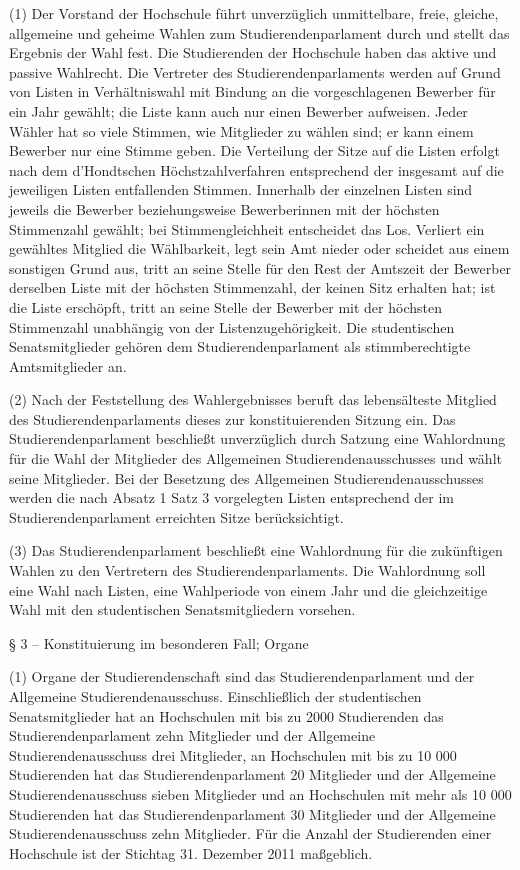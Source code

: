 \documentclass[
10pt,
a4paper,
twoside,								%
titlepage=false,							%
draft=false								%
]{scrartcl}
\begin{document}
(1) Der Vorstand der Hochschule führt unverzüglich unmittelbare, freie, gleiche, allgemeine und geheime Wahlen zum Studierendenparlament durch und stellt das Ergebnis der Wahl fest. Die Studierenden der Hochschule haben das aktive und passive Wahlrecht. Die Vertreter des Studierendenparlaments werden auf Grund von Listen in Verhältniswahl mit Bindung an die vorgeschlagenen Bewerber für ein Jahr gewählt; die Liste kann auch nur einen Bewerber aufweisen. Jeder Wähler hat so viele Stimmen, wie Mitglieder zu wählen sind; er kann einem Bewerber nur eine Stimme geben. Die Verteilung der Sitze auf die Listen erfolgt nach dem d’Hondtschen Höchstzahlverfahren entsprechend der insgesamt auf die jeweiligen Listen entfallenden Stimmen. Innerhalb der einzelnen Listen sind jeweils die Bewerber beziehungsweise Bewerberinnen mit der höchsten Stimmenzahl gewählt; bei Stimmengleichheit entscheidet das Los. Verliert ein gewähltes Mitglied die Wählbarkeit, legt sein Amt nieder oder scheidet aus einem sonstigen Grund aus, tritt an seine Stelle für den Rest der Amtszeit der Bewerber derselben Liste mit der höchsten Stimmenzahl, der keinen Sitz erhalten hat; ist die Liste erschöpft, tritt an seine Stelle der Bewerber mit der höchsten Stimmenzahl unabhängig von der Listenzugehörigkeit. Die studentischen Senatsmitglieder gehören dem Studierendenparlament als stimmberechtigte Amtsmitglieder an.

(2) Nach der Feststellung des Wahlergebnisses beruft das lebensälteste Mitglied des Studierendenparlaments dieses zur konstituierenden Sitzung ein. Das Studierendenparlament beschließt unverzüglich durch Satzung eine Wahlordnung für die Wahl der Mitglieder des Allgemeinen Studierendenausschusses und wählt seine Mitglieder. Bei der Besetzung des Allgemeinen Studierendenausschusses werden die nach Absatz 1 Satz 3 vorgelegten Listen entsprechend der im Studierendenparlament erreichten Sitze berücksichtigt.

(3) Das Studierendenparlament beschließt eine Wahlordnung für die zukünftigen Wahlen zu den Vertretern des Studierendenparlaments. Die Wahlordnung soll eine Wahl nach Listen, eine Wahlperiode von einem Jahr und die gleichzeitige Wahl mit den studentischen Senatsmitgliedern vorsehen.


§ 3 – Konstituierung im besonderen Fall; Organe

(1) Organe der Studierendenschaft sind das Studierendenparlament und der Allgemeine Studierendenausschuss. Einschließlich der studentischen Senatsmitglieder hat an Hochschulen mit bis zu 2000 Studierenden das Studierendenparlament zehn Mitglieder und der Allgemeine Studierendenausschuss drei Mitglieder, an Hochschulen mit bis zu 10 000 Studierenden hat das Studierendenparlament 20 Mitglieder und der Allgemeine Studierendenausschuss sieben Mitglieder und an Hochschulen mit mehr als 10 000 Studierenden hat das Studierendenparlament 30 Mitglieder und der Allgemeine Studierendenausschuss zehn Mitglieder. Für die Anzahl der Studierenden einer Hochschule ist der Stichtag 31. Dezember 2011 maßgeblich.
\end{document}
